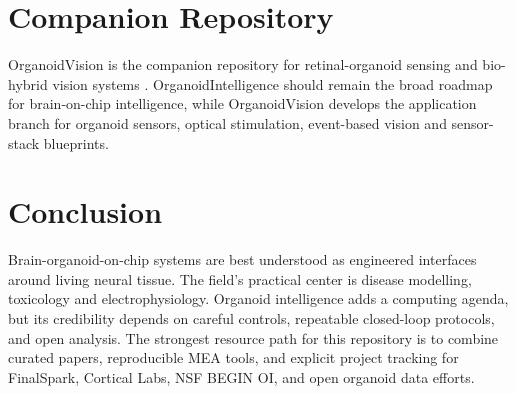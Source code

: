 \documentclass[10pt,twocolumn]{article}
\begin{document}
\section{Companion Repository}

OrganoidVision is the companion repository for retinal-organoid sensing and bio-hybrid vision systems \cite{organoidvision2026}. OrganoidIntelligence should remain the broad roadmap for brain-on-chip intelligence, while OrganoidVision develops the application branch for organoid sensors, optical stimulation, event-based vision and sensor-stack blueprints.

\section{Conclusion}

Brain-organoid-on-chip systems are best understood as engineered interfaces around living neural tissue. The field's practical center is disease modelling, toxicology and electrophysiology. Organoid intelligence adds a computing agenda, but its credibility depends on careful controls, repeatable closed-loop protocols, and open analysis. The strongest resource path for this repository is to combine curated papers, reproducible MEA tools, and explicit project tracking for FinalSpark, Cortical Labs, NSF BEGIN OI, and open organoid data efforts.
\end{document}
